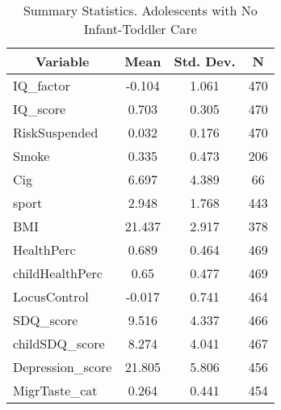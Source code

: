 
\begin{table}[htbp]\centering \caption{Summary Statistics. Adolescents with No Infant-Toddler Care \label{schoolAdolasiloNone}}
\begin{tabular}{l c c  c}\hline\hline
\multicolumn{1}{c}{\textbf{Variable}} & \textbf{Mean}
 & \textbf{Std. Dev.} & \textbf{N}\\ \hline
IQ\_factor & -0.104 & 1.061  & 470\\
IQ\_score & 0.703 & 0.305  & 470\\
RiskSuspended & 0.032 & 0.176  & 470\\
Smoke & 0.335 & 0.473  & 206\\
Cig & 6.697 & 4.389  & 66\\
sport & 2.948 & 1.768  & 443\\
BMI & 21.437 & 2.917  & 378\\
HealthPerc & 0.689 & 0.464  & 469\\
childHealthPerc & 0.65 & 0.477  & 469\\
LocusControl & -0.017 & 0.741  & 464\\
SDQ\_score & 9.516 & 4.337  & 466\\
childSDQ\_score & 8.274 & 4.041  & 467\\
Depression\_score & 21.805 & 5.806  & 456\\
MigrTaste\_cat & 0.264 & 0.441  & 454\\
\hline\end{tabular}
\end{table}
